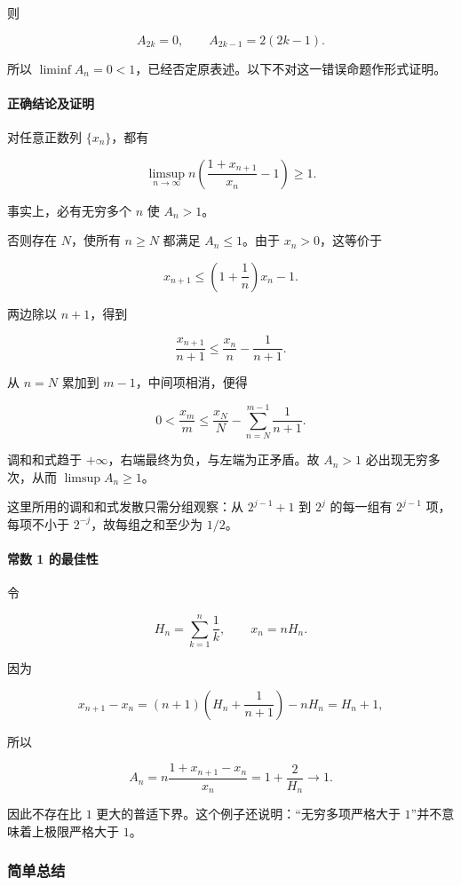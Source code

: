 \documentclass[11pt,a4paper]{article}
\begin{document}
则

\[
A_{2k}=0,\qquad A_{2k-1}=2(2k-1).
\]

所以
\(\liminf A_n=0<1\)，已经否定原表述。以下不对这一错误命题作形式证明。

\paragraph{正确结论及证明}\label{ux6b63ux786eux7ed3ux8bbaux53caux8bc1ux660e}

对任意正数列 \(\{x_n\}\)，都有

\[
\boxed{\limsup_{n\to\infty}
n\left(\frac{1+x_{n+1}}{x_n}-1\right)\ge1.}
\]

事实上，必有无穷多个 \(n\) 使 \(A_n>1\)。

否则存在 \(N\)，使所有 \(n\ge N\) 都满足 \(A_n\le1\)。由于
\(x_n>0\)，这等价于

\[
x_{n+1}\le\left(1+\frac1n\right)x_n-1.
\]

两边除以 \(n+1\)，得到

\[
\frac{x_{n+1}}{n+1}\le\frac{x_n}{n}-\frac1{n+1}.
\]

从 \(n=N\) 累加到 \(m-1\)，中间项相消，便得

\[
0<\frac{x_m}{m}
\le\frac{x_N}{N}-\sum_{n=N}^{m-1}\frac1{n+1}.
\]

调和和式趋于 \(+\infty\)，右端最终为负，与左端为正矛盾。故 \(A_n>1\)
必出现无穷多次，从而 \(\limsup A_n\ge1\)。

这里所用的调和和式发散只需分组观察：从 \(2^{j-1}+1\) 到 \(2^j\)
的每一组有 \(2^{j-1}\) 项，每项不小于 \(2^{-j}\)，故每组之和至少为
\(1/2\)。

\paragraph{常数 1
的最佳性}\label{ux5e38ux6570-1-ux7684ux6700ux4f73ux6027}

令

\[
H_n=\sum_{k=1}^{n}\frac1k,\qquad x_n=nH_n.
\]

因为

\[
x_{n+1}-x_n
=(n+1)\left(H_n+\frac1{n+1}\right)-nH_n
=H_n+1,
\]

所以

\[
A_n=n\frac{1+x_{n+1}-x_n}{x_n}
=1+\frac2{H_n}\longrightarrow1.
\]

因此不存在比 \(1\) 更大的普适下界。这个例子还说明：``无穷多项严格大于
\(1\)''并不意味着上极限严格大于 \(1\)。

\subsubsection{简单总结}\label{ux7b80ux5355ux603bux7ed3-23}
\end{document}
